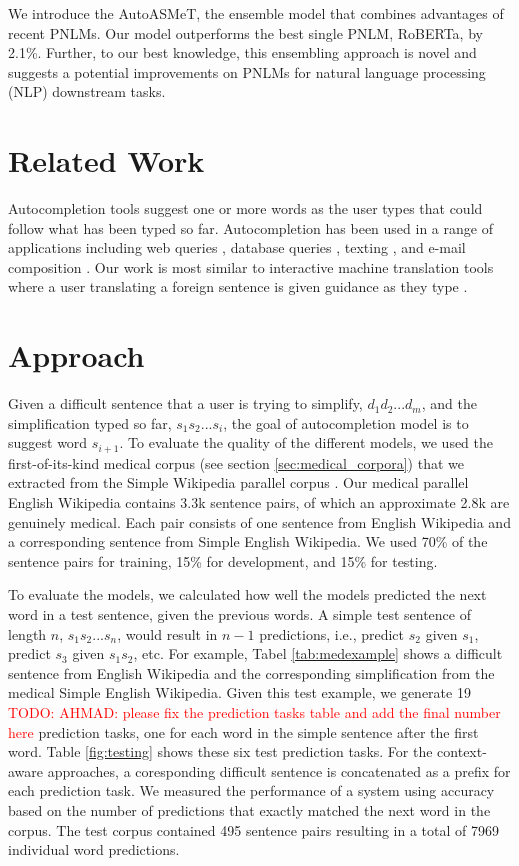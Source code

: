 \documentclass[11pt]{article}
\newcommand{\todo}[1]{\textcolor{red}{TODO: #1}}
\begin{document}
 We introduce the AutoASMeT, the ensemble model that combines advantages of recent PNLMs. Our model outperforms the best single PNLM, RoBERTa, by 2.1\%. Further, to our best knowledge, this ensembling approach is novel and suggests a potential improvements on PNLMs for natural language processing (NLP) downstream tasks.

\section{Related Work}

Autocompletion tools suggest one or more words as the user types that could follow what has been typed so far. Autocompletion has been used in a range of applications including web queries \cite{cai2016survey}, database queries \cite{khoussainova2010snipsuggest}, texting \cite{dunlop2000predictive}, and e-mail composition \cite{dai2019gmail}. Our work is most similar to interactive machine translation tools where a user translating a foreign sentence is given guidance as they type \cite{green-etal-2014-human}.

\section{Approach}

Given a difficult sentence that a user is trying to simplify, $d_1 d_2 ... d_m$, and the simplification typed so far, $s_1 s_2 ... s_i$, the goal of autocompletion model is to suggest word $s_{i+1}$. To evaluate the quality of the different models, we used the first-of-its-kind medical corpus (see section \ref{sec:medical_corpora}) that we extracted from the Simple Wikipedia parallel corpus \cite{kauchak2013improving}. Our medical parallel English Wikipedia contains 3.3k sentence pairs, of which an approximate 2.8k are genuinely medical. Each pair consists of one sentence from English Wikipedia and a corresponding sentence from Simple English Wikipedia. We used 70\% of the sentence pairs for training, 15\% for development, and 15\% for testing. 

To evaluate the models, we calculated how well the models predicted the next word in a test sentence, given the previous words.  A simple test sentence of length $n$, $s_1 s_2 ... s_n$, would result in $n-1$ predictions, i.e., predict $s_2$ given $s_1$, predict $s_3$ given $s_1 s_2$, etc.  For example, Tabel \ref{tab:medexample} shows a difficult sentence from English Wikipedia and the corresponding simplification from the medical Simple English Wikipedia. Given this test example, we generate 19 \todo{AHMAD: please fix the prediction tasks table and add the final number here} prediction tasks, one for each word in the simple sentence after the first word.  Table \ref{fig:testing} shows these six test prediction tasks.  For the context-aware approaches, a coresponding difficult sentence is concatenated as a prefix for each prediction task. We measured the performance of a system using accuracy based on the number of predictions that exactly matched the next word in the corpus.  The test corpus contained 495 sentence pairs resulting in a total of 7969 individual word predictions. 
\end{document}
